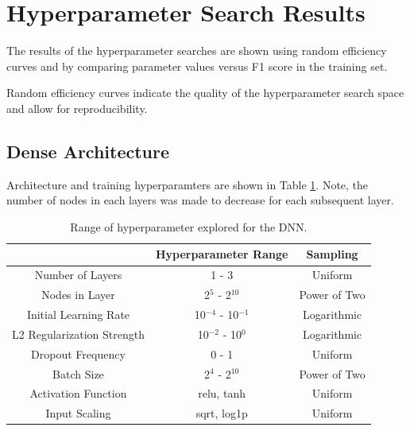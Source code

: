\section{Hyperparameter Search Results}

The results of the hyperparameter searches are shown using random efficiency curves and by comparing parameter values versus F1 score in the training set.

Random efficiency curves indicate the quality of the hyperparameter search space and allow for reproducibility. 



\subsection{Dense Architecture}

Architecture and training hyperparamters are shown in Table \ref{table:hyperparameter_dataset_parameters_DNN}. Note, the number of nodes in each layers was made to decrease for each subsequent layer.

\begin{table}[H]
\centering
\caption{Range of hyperparameter explored for the DNN.}
\label{table:hyperparameter_dataset_parameters_DNN}
\begin{tabular}{c|c|c|}
\cline{2-3}
 & Hyperparameter Range & Sampling \\ \hline
\multicolumn{1}{|c|}{Number of Layers} & 1 - 3 & Uniform \\ \hline
\multicolumn{1}{|c|}{Nodes in Layer} & 2$^{5}$ - 2$^{10}$ & Power of Two \\ \hline
\multicolumn{1}{|c|}{Initial Learning Rate} & 10$^{-4}$ - 10$^{-1}$ & Logarithmic \\ \hline
\multicolumn{1}{|c|}{L2 Regularization Strength} & 10$^{-2}$ - 10$^{0}$ & Logarithmic \\ \hline
\multicolumn{1}{|c|}{Dropout Frequency} & 0 - 1 & Uniform \\ \hline
\multicolumn{1}{|c|}{Batch Size} & 2$^{4}$ - 2$^{10}$ & Power of Two \\ \hline
\multicolumn{1}{|c|}{Activation Function} & relu, tanh & Uniform \\ \hline
\multicolumn{1}{|c|}{Input Scaling} & sqrt, log1p & Uniform \\ \hline
\end{tabular}
\end{table}



